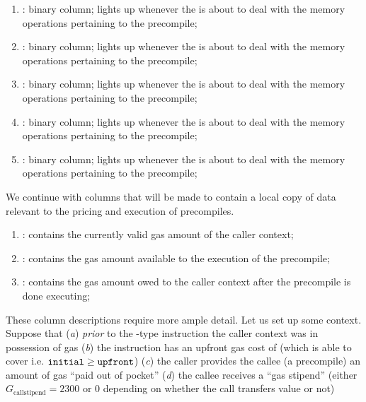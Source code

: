 \begin{enumerate}[resume]
	\item \scenBlsGoneMsm:        binary column; lights up whenever the \zkEvm{} is about to deal with the memory operations pertaining to the             precompile;
	\item \scenBlsGtwoAdd:        binary column; lights up whenever the \zkEvm{} is about to deal with the memory operations pertaining to the             precompile;
	\item \scenBlsGtwoMsm:        binary column; lights up whenever the \zkEvm{} is about to deal with the memory operations pertaining to the             precompile;
	\item \scenBlsPairingCheck:   binary column; lights up whenever the \zkEvm{} is about to deal with the memory operations pertaining to the    precompile;
	\item \scenBlsMapFpToGone:    binary column; lights up whenever the \zkEvm{} is about to deal with the memory operations pertaining to the   precompile;
\end{enumerate}
We continue with columns that will be made to contain a local copy of data relevant to the pricing and execution of precompiles.
\begin{enumerate}[resume]
	\item \scenPrcCurrentlyValidCallerGas:
		contains the currently valid gas amount of the caller context; 
	\item \scenPrcGasAllowance:
		contains the gas amount available to the execution of the precompile;
	\item \scenPrcGasOwedToCaller:
		contains the gas amount owed to the caller context after the precompile is done executing; 
\end{enumerate}
These column descriptions require more ample detail.
Let us set up some context.
Suppose that
(\emph{a}) \emph{prior} to the -type instruction the caller context was in possession of \hereInitial{} gas
(\emph{b}) the instruction has an upfront gas cost of \hereUpfront{} (which \hereInitial{} is able to cover i.e. $\texttt{initial} \geq \texttt{upfront}$)
(\emph{c}) the caller provides the callee (a precompile) an amount \herePoop{} of gas ``paid out of pocket''
(\emph{d}) the callee receives a ``gas stipend'' \hereStipend{} (either $G_\text{callstipend} = 2300$ or $0$ depending on whether the call transfers value or not)
